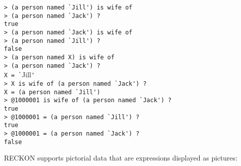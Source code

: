 \documentclass[12pt]{article}
\newenvironment{indpar}[1][0.3in]%
	{\begin{list}{}%
		     {\setlength{\itemsep}{0in}%
		      \setlength{\topsep}{0in}%
		      \setlength{\parsep}{1ex}%
		      \setlength{\labelwidth}{#1}%
		      \setlength{\leftmargin}{#1}%
		      \addtolength{\leftmargin}{\labelsep}}%
	 \item}%
	{\end{list}}
\begin{document}
\begin{indpar}
\verb|> (a person named `Jill') is wife of| \\
\verb|> (a person named `Jack') ?| \\
\verb|true| \\
\verb|> (a person named `Jack') is wife of| \\
\verb|> (a person named `Jill') ?| \\
\verb|false| \\
\verb|> (a person named X) is wife of| \\
\verb|> (a person named `Jack') ?| \\
\verb|X = `|Jill\verb|'| \\
\verb|> X is wife of (a person named `Jack') ?| \\
\verb|X = (a person named `Jill')| \\
\verb|> @1000001 is wife of (a person named `Jack') ?| \\
\verb|true| \\
\verb|> @1000001 = (a person named `Jill') ?| \\
\verb|true| \\
\verb|> @1000001 = (a person named `Jack') ?| \\
\verb|false|
\end{indpar}

RECKON supports pictorial data
that are expressions displayed as pictures:
\end{document}
